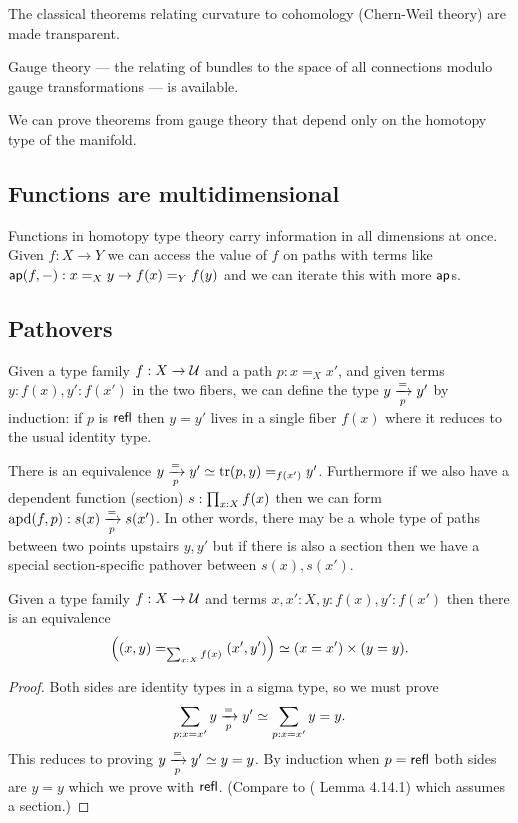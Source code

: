 \documentclass[12pt]{article}
\begin{document}
\begin{myclaim}
The classical theorems relating curvature to cohomology (Chern-Weil theory) are made transparent.
\end{myclaim}

\begin{myclaim}
Gauge theory --- the relating of bundles to the space of all connections modulo gauge transformations --- is available.
\end{myclaim}

\begin{myclaim}
We can prove theorems from gauge theory that depend only on the homotopy type of the manifold.
\end{myclaim}

\subsection{Functions are multidimensional}

Functions in homotopy type theory carry information in all dimensions at once. Given \( f:X\to Y \) we can access the value of \( f \) on paths with terms like \( \textsf{ap}(f,-):x=_Xy\to f(x)=_Y f(y) \) and we can iterate this with more \( \textsf{ap} \)s. 

\subsection{Pathovers}
Given a type family \( f:X\to \mathcal{U} \) and a path \( p:x=_X x' \), and given terms \( y:f(x), y':f(x') \) in the two fibers, we can define the type \( y\xrightarrow[{p}]{=}y' \) by induction: if \( p \) is \( \textsf{refl} \) then \( y=y' \) lives in a single fiber \( f(x) \) where it reduces to the usual identity type.

There is an equivalence \( y\xrightarrow[{p}]{=}y'\simeq \mathrm{tr}(p,y)=_{f(x')}y' \). Furthermore if we also have a dependent function (section) \( s:\prod_{x:X} f(x) \) then we can form \( \mathrm{apd}(f,p):s(x)\xrightarrow[{p}]{=}s(x') \). In other words, there may be a whole type of paths between two points upstairs \( y, y' \) but if there is also a section then we have a special section-specific pathover between \( s(x), s(x') \).

\begin{mylemma}
Given a type family \( f:X\to\mathcal{U} \) and terms \( x,x':X, y:f(x), y':f(x') \) then there is an equivalence 
\[ 
  \left((x,y) =_{\sum_{x:X}f(x)} (x',y')\right) \simeq 
  (x=x')\times (y=y).
\]
\end{mylemma}
\begin{proof}
Both sides are identity types in a sigma type, so we must prove
\[ 
\sum_{p:x=x'}y\xrightarrow[{p}]{=}y' \simeq \sum_{p:x=x'}y=y.
\] 
This reduces to proving \( y\xrightarrow[{p}]{=}y'\simeq y=y  \). By induction when \( p=\textsf{refl} \) both sides are \( y=y \) which we prove with \( \textsf{refl} \). (Compare to (\cite{Symmetry} Lemma 4.14.1) which assumes a section.)
\end{proof}
\end{document}
